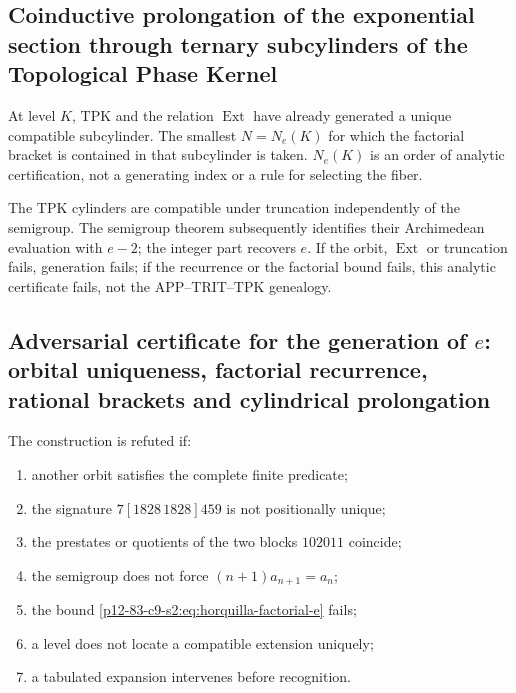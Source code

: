 \subsection{Coinductive prolongation of the exponential section through ternary subcylinders of the Topological Phase Kernel}

At level \(K\), TPK and the relation \(\operatorname{Ext}\) have already generated
a unique compatible subcylinder. The smallest \(N=N_e(K)\) for which
the factorial bracket is contained in that subcylinder is taken. \(N_e(K)\) is an
order of analytic certification, not a generating index or a rule for
selecting the fiber.

The TPK cylinders are compatible under truncation independently of the
semigroup. The semigroup theorem subsequently identifies their Archimedean
evaluation with \(e-2\); the integer part recovers \(e\). If the orbit,
\(\operatorname{Ext}\) or truncation fails, generation fails; if the
recurrence or the factorial bound fails, this analytic certificate fails, not the
APP--TRIT--TPK genealogy.

\subsection{Adversarial certificate for the generation of \(e\): orbital uniqueness, factorial recurrence, rational brackets and cylindrical prolongation}

\begin{criterion}
The construction is refuted if:
\begin{enumerate}
 \item another orbit satisfies the complete finite predicate;
 \item the signature \(7[1828\,1828]459\) is not positionally unique;
 \item the prestates or quotients of the two blocks \(102011\) coincide;
 \item the semigroup does not force \((n+1)a_{n+1}=a_n\);
 \item the bound \eqref{p12-83-c9-s2:eq:horquilla-factorial-e} fails;
 \item a level does not locate a compatible extension uniquely;
 \item a tabulated expansion intervenes before recognition.
\end{enumerate}
\end{criterion}



